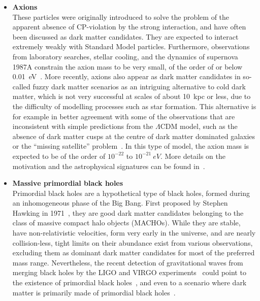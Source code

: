 \begin{itemize}
 \item[] \textbf{Axions}\\
         These particles were originally introduced to solve the problem of the apparent absence of CP-violation by the strong interaction, and have often been discussed as dark matter candidates. They are expected to interact extremely weakly with Standard Model particles. Furthermore, observations from laboratory searches, stellar cooling, and the dynamics of supernova 1987A constrain the axion mass to be very small, of the order of or below \SI{0.01}{eV}~\cite{Rosenberg:2000wb}. More recently, axions also appear as dark matter candidates in so-called fuzzy dark matter scenarios as an intriguing alternative to cold dark matter, which is not very successful at scales of about \SI{10}{kpc} or less, due to the difficulty of modelling processes such as star formation. This alternative is for example in better agreement with some of the observations that are inconsistent with simple predictions from the $\Lambda$CDM model, such as the absence of dark matter cusps at the centre of dark matter dominated galaxies or the ``missing satellite'' problem~\cite{Klypin:1999uc,Moore:1999nt}. In this type of model, the axion mass is expected to be of the order of $10^{-22}$ to $ 10^{-21}\SI{}{eV}$. More details on the motivation and the astrophysical signatures can be found in~\cite{Hui:2016ltb}.
         
 \item[] \textbf{Massive primordial black holes}\\
	 Primordial black holes are a hypothetical type of black holes, formed during an inhomogeneous phase of the Big Bang. First proposed by Stephen Hawking in 1971~\cite{Hawking:1971ei}, they are good dark matter candidates belonging to the class of massive compact halo objects (MACHOs). While they are stable, have non-relativistic velocities, form very early in the universe, and are nearly collision-less, tight limits on their abundance exist from various observations, excluding them as dominant dark matter candidates for most of the preferred mass range. Nevertheless, the recent detection of gravitational waves from merging black holes by the LIGO and VIRGO experiments~\cite{Abbott:2016blz} could point to the existence of primordial black holes~\cite{Sasaki:2016jop}, and even to a scenario where dark matter is primarily made of primordial black holes~\cite{Clesse:2016vqa, Bird:2016dcv}.
         

\end{itemize}
